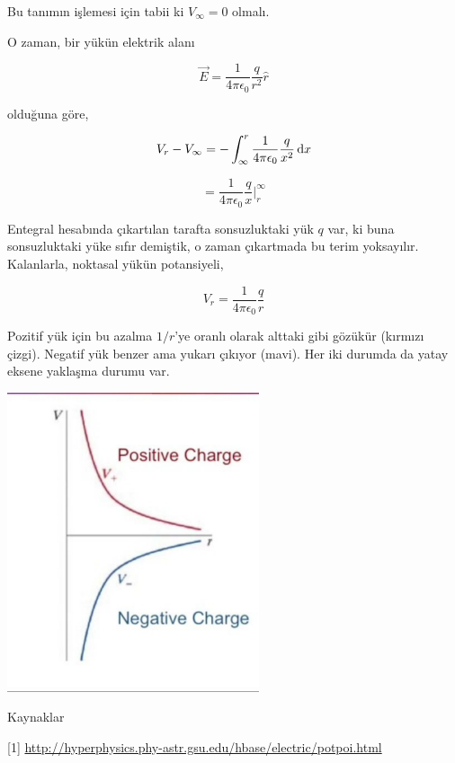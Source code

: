 \documentclass[12pt,fleqn]{article}\usepackage{../../common}
\begin{document}
Bu tanımın işlemesi için tabii ki $V_\infty = 0$ olmalı.

O zaman, bir yükün elektrik alanı

$$
\vec{E} = \frac{1}{4\pi\epsilon_0} \frac{q}{r^2}\hat{r}
$$

olduğuna göre, 

$$
V_r - V_\infty =
-\int_{\infty}^{r}  \frac{1}{4\pi\epsilon_0} \frac{q}{x^2} \,\mathrm{d} x
$$

$$
= \frac{1}{4\pi\epsilon_0} \frac{q}{x} \bigg|_{r}^{\infty} 
$$

Entegral hesabında çıkartılan tarafta sonsuzluktaki yük $q$ var, ki buna
sonsuzluktaki yüke sıfır demiştik, o zaman çıkartmada bu terim
yoksayılır. Kalanlarla, noktasal yükün potansiyeli,

$$
V_r = \frac{1}{4\pi\epsilon_0} \frac{q}{r}
$$

Pozitif yük için bu azalma $1/r$'ye oranlı olarak alttaki gibi gözükür (kırmızı
çizgi). Negatif yük benzer ama yukarı çıkıyor (mavi). Her iki durumda da yatay
eksene yaklaşma durumu var.

\includegraphics[width=20em]{10_01.jpg}

Kaynaklar

[1] \url{http://hyperphysics.phy-astr.gsu.edu/hbase/electric/potpoi.html}
\end{document}

